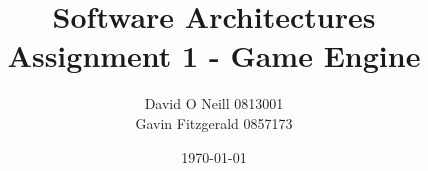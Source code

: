 \documentclass[12pt,a4paper]{report}
\begin{document}
	
	
\title{Software Architectures\\ Assignment 1 - Game Engine}
\author{David O Neill 0813001\\
  Gavin Fitzgerald 0857173}
\date{\today}

\begin{titlepage}
\maketitle
\end{titlepage}

\thispagestyle{empty}
\pagestyle{empty}





\thispagestyle{empty}
\cleardoublepage
\tableofcontents
\thispagestyle{empty}
\pagestyle{plain}











\nocite{*}
{\small
\cleardoublepage
}


\cleardoublepage
\listoffigures
{}

\end{document}

